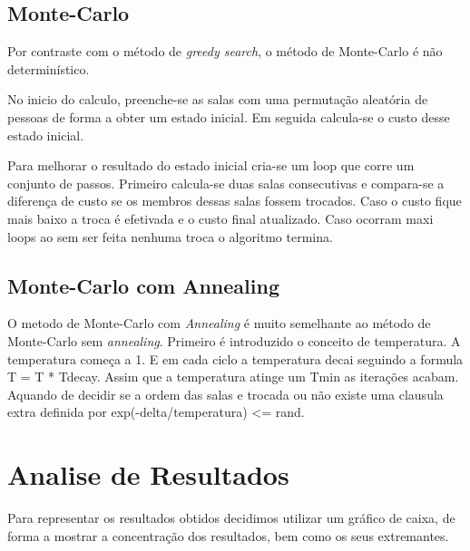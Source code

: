 \documentclass[a4paper]{report}
\begin{document}
\section{Monte-Carlo}

Por contraste com o método de \textit{greedy search}, o método de Monte-Carlo é
não determinístico.

No inicio do calculo, preenche-se as salas com uma permutação aleatória de
pessoas de forma a obter um estado inicial. Em seguida calcula-se o custo desse
estado inicial.

Para melhorar o resultado do estado inicial cria-se um loop que corre um
conjunto de passos. Primeiro calcula-se duas salas consecutivas e compara-se a
diferença de custo se os membros dessas salas fossem trocados. Caso o custo
fique mais baixo a troca é efetivada e o custo final atualizado. Caso ocorram
maxi loops ao sem ser feita nenhuma troca o algoritmo termina.

\section{Monte-Carlo com Annealing}

O metodo de Monte-Carlo com \textit{Annealing} é muito semelhante ao método de
Monte-Carlo sem \textit{annealing}. Primeiro é introduzido o conceito de
temperatura. A temperatura começa a 1. E em cada ciclo a temperatura decai
seguindo a formula T = T * Tdecay. Assim que a temperatura atinge um Tmin as
iterações acabam. Aquando de decidir se a ordem das salas e trocada ou não
existe uma clausula extra definida por exp(-delta/temperatura) <= rand.

\chapter{Analise de Resultados}

Para representar os resultados obtidos decidimos utilizar um gráfico de caixa,
de forma a mostrar a concentração dos resultados, bem como os seus extremantes.
\end{document}
